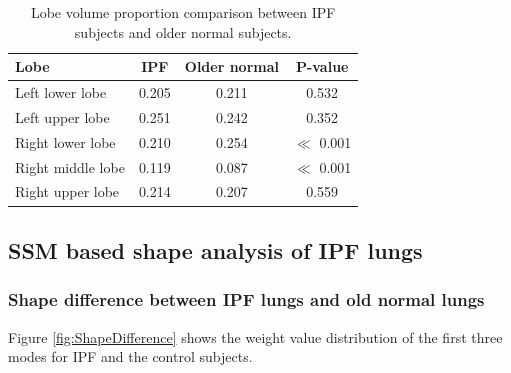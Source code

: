 \begin{table}[htbp]
\centering
\caption{Lobe volume proportion comparison between IPF subjects and older normal subjects.}
\label{tab:LobeVolumeComparison}
\begin{tabular}{| l | c | c | c |}
\hline
\bf{Lobe} & \bf{IPF} & \bf{Older normal} & \bf{P-value}\\
\hline
Left lower lobe & 0.205 & 0.211 & 0.532\\
\hline
Left upper lobe	& 0.251 & 0.242 & 0.352\\
\hline
Right lower lobe	& 0.210 & 0.254 & $\ll$ 0.001\\
\hline
Right middle lobe	& 0.119 & 0.087 & $\ll$ 0.001\\
\hline
Right upper lobe	& 0.214 & 0.207 & 0.559\\
\hline
\end{tabular}
\end{table}

\subsection{SSM based shape analysis of IPF lungs}
\subsubsection{Shape difference between IPF lungs and old normal lungs}
Figure \ref{fig:ShapeDifference} shows the weight value distribution of the first three modes for IPF and the control subjects. 

